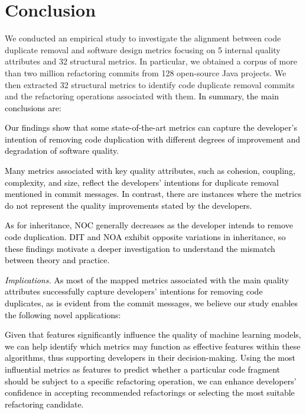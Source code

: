 \section{Conclusion}
\label{Section:Conclusion}

We conducted an empirical study to investigate the alignment between code duplicate removal and software design metrics focusing on 5 internal quality attributes and 32 structural metrics. In particular, we obtained a corpus of more than two million refactoring commits from 128 open-source Java projects. We then extracted 32 structural metrics to identify code duplicate removal commits and the refactoring operations associated with them. \textcolor{black}{ In summary, the main conclusions are:}

\textemdash \textcolor{black}{Our findings show that some state-of-the-art metrics can capture the developer's intention of removing code duplication with different degrees of improvement
and degradation of software quality.}

\textemdash \textcolor{black}{Many metrics associated with key quality attributes, such as cohesion, coupling, complexity, and size, reflect the developers' intentions for duplicate removal mentioned in commit messages. In contrast, there are instances where the metrics do not represent the quality improvements stated by the developers.}

\textemdash \textcolor{black}{As for inheritance, NOC generally decreases as the developer intends to remove code duplication. DIT and NOA exhibit
opposite variations in inheritance, so these findings motivate a deeper investigation to understand the mismatch between theory and practice.}

\textcolor{black}{\textit{Implications.} As most of the mapped metrics associated with the main quality attributes successfully capture developers’ intentions for removing code duplicates, as is evident from the commit messages, we believe our study enables the following novel applications:}

\textemdash \textcolor{black}{Given that features significantly influence the quality of machine learning models, we can help identify which metrics may function as effective features within these algorithms, thus supporting developers in their decision-making. Using the most influential metrics as features to predict whether a particular code fragment should be subject to a specific refactoring operation, we can enhance developers’ confidence in accepting recommended refactorings or selecting the most suitable refactoring candidate.}

